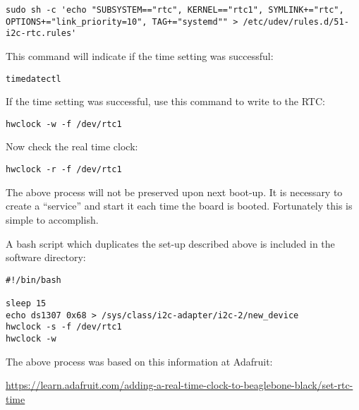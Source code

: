 \begin{verbatim}
sudo sh -c 'echo "SUBSYSTEM=="rtc", KERNEL=="rtc1", SYMLINK+="rtc", OPTIONS+="link_priority=10", TAG+="systemd"" > /etc/udev/rules.d/51-i2c-rtc.rules'
\end{verbatim}

This command will indicate if the time setting was successful:

\begin{verbatim}
timedatectl
\end{verbatim}

If the time setting was successful, use this command to write to the RTC:

\begin{verbatim}
hwclock -w -f /dev/rtc1
\end{verbatim}

Now check the real time clock:

\begin{verbatim}
hwclock -r -f /dev/rtc1
\end{verbatim}

The above process will not be preserved upon next boot-up.  It is necessary to create a ``service'' and start it each time the board is booted.  Fortunately this is simple to accomplish.

A bash script which duplicates the set-up described above is included in the software directory:

\begin{verbatim}
#!/bin/bash

sleep 15
echo ds1307 0x68 > /sys/class/i2c-adapter/i2c-2/new_device
hwclock -s -f /dev/rtc1
hwclock -w
\end{verbatim}

The above process was based on this information at Adafruit:

\url{https://learn.adafruit.com/adding-a-real-time-clock-to-beaglebone-black/set-rtc-time}


